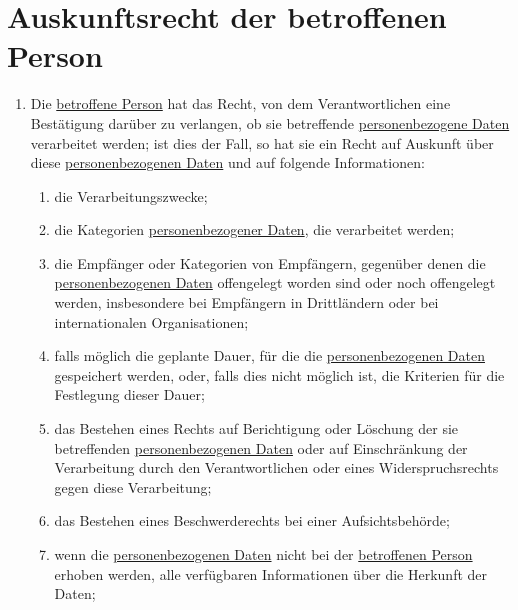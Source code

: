 \chapter{Auskunftsrecht der betroffenen Person}
\label{ch:15}


\begin{enumerate}

  \item Die \hyperref[itm:04-1]{betroffene Person} hat das Recht, von dem Verantwortlichen eine Bestätigung darüber zu verlangen, ob sie
   betreffende \hyperref[itm:04-1]{personenbezogene Daten} verarbeitet werden; ist dies der Fall, so hat sie ein Recht auf Auskunft über
   diese \hyperref[itm:04-1]{personenbezogenen Daten} und auf folgende Informationen:
  \label{itm:15-1}

  \begin{enumerate}
  
    \item die Verarbeitungszwecke;
    \label{itm:15-1a}

    \item die Kategorien \hyperref[itm:04-1]{personenbezogener Daten}, die verarbeitet werden;
    \label{itm:15-1b}

    \item die Empfänger oder Kategorien von Empfängern, gegenüber denen die \hyperref[itm:04-1]{personenbezogenen Daten} offengelegt worden
     sind oder noch offengelegt werden, insbesondere bei Empfängern in Drittländern oder bei internationalen
     Organisationen;
    \label{itm:15-1c}

    \item falls möglich die geplante Dauer, für die die \hyperref[itm:04-1]{personenbezogenen Daten} gespeichert werden, oder, falls dies
     nicht möglich ist, die Kriterien für die Festlegung dieser Dauer;
    \label{itm:15-1d}

    \item das Bestehen eines Rechts auf Berichtigung oder Löschung der sie betreffenden \hyperref[itm:04-1]{personenbezogenen Daten} oder auf
     Einschränkung der Verarbeitung durch den Verantwortlichen oder eines Widerspruchsrechts gegen diese Verarbeitung;
    \label{itm:15-1e}

    \item das Bestehen eines Beschwerderechts bei einer Aufsichtsbehörde;
    \label{itm:15-1f}

    \item wenn die \hyperref[itm:04-1]{personenbezogenen Daten} nicht bei der \hyperref[itm:04-1]{betroffenen Person} erhoben werden, alle verfügbaren
     Informationen über die Herkunft der Daten;
    \label{itm:15-1g}


\end{enumerate}
\end{enumerate}
